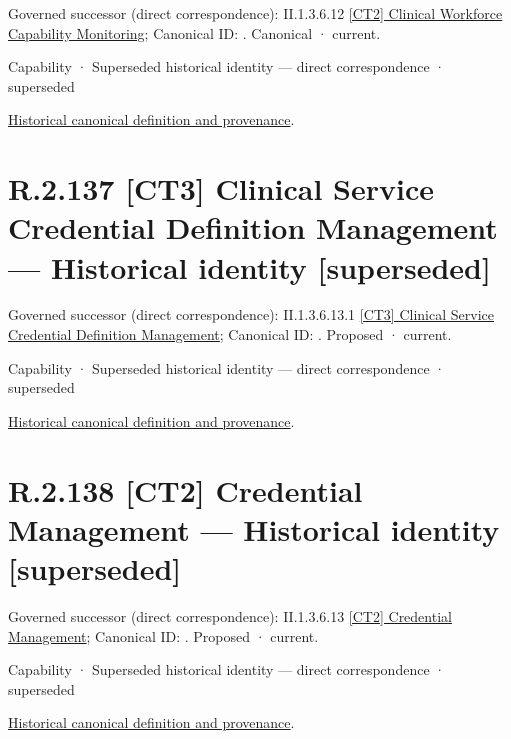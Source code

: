 {\small Governed successor (direct correspondence): II.1.3.6.12 \hyperref[element:367b3e5643f44fa785f093db8bb9a6e8]{[CT2] Clinical Workforce Capability Monitoring}; Canonical ID: \texttt{}. Canonical · current.}\par
\label{element:24c015676c254e2e82e8e4287c295179}
{\small Capability · Superseded historical identity — direct correspondence · superseded}\par
\href{../../../../../../../continuum/strategy/capability/24c015676c254e2e82e8e4287c295179.md}{Historical canonical definition and provenance}.\par
\section*{R.2.137 [CT3] Clinical Service Credential Definition Management — Historical identity [superseded]}
\label{navigation:R.2.137}

{\small Governed successor (direct correspondence): II.1.3.6.13.1 \hyperref[element:2e5c97f51e7e48d1b865ac416dd8099d]{[CT3] Clinical Service Credential Definition Management}; Canonical ID: \texttt{}. Proposed · current.}\par
\label{element:0115ed50867d468a95c0fafa1c5d79e2}
{\small Capability · Superseded historical identity — direct correspondence · superseded}\par
\href{../../../../../../../continuum/strategy/capability/0115ed50867d468a95c0fafa1c5d79e2.md}{Historical canonical definition and provenance}.\par
\section*{R.2.138 [CT2] Credential Management — Historical identity [superseded]}
\label{navigation:R.2.138}

{\small Governed successor (direct correspondence): II.1.3.6.13 \hyperref[element:21eed4fc8c924496b16c6ddaa32f3d01]{[CT2] Credential Management}; Canonical ID: \texttt{}. Proposed · current.}\par
\label{element:bab3d0ab6eb748978b962ea20fb31640}
{\small Capability · Superseded historical identity — direct correspondence · superseded}\par
\href{../../../../../../../continuum/strategy/capability/bab3d0ab6eb748978b962ea20fb31640.md}{Historical canonical definition and provenance}.\par
